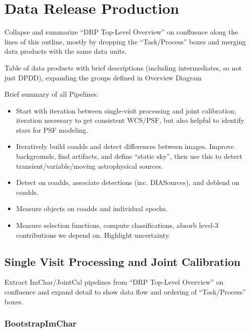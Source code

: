 \section{Data Release Production}

\begin{note}
Collapse and summarize ``DRP Top-Level Overview'' on confluence along the lines of this outline, mostly by dropping the ``Task/Process'' boxes and merging data products with the same data units.
\end{note}

\begin{note}
Table of data products with brief descriptions (including intermediates, so not just DPDD), expanding the groups defined in Overview Diagram
\end{note}

Brief summary of all Pipelines:
\begin{itemize}
\item Start with iteration between single-visit processing and joint calibration; iteration necessary to get consistent WCS/PSF, but also helpful to identify stars for PSF modeling.
\item Iteratively build coadds and detect differences between images.  Improve backgrounds, find artifacts, and define ``static sky'', then use this to detect transient/variable/moving astrophysical sources.
\item Detect on coadds, associate detections (inc. DIASources), and deblend on coadds.
\item Measure objects on coadds and individual epochs.
\item Measure selection functions, compute classifications, absorb level-3 contributions we depend on.  Highlight uncertainty.
\end{itemize}

\subsection{Single Visit Processing and Joint Calibration}

\begin{note}
Extract ImChar/JointCal pipelines from ``DRP Top-Level Overview'' on confluence and expand detail to show data flow and ordering of ``Task/Process'' boxes.
\end{note}

\subsubsection{BootstrapImChar}
